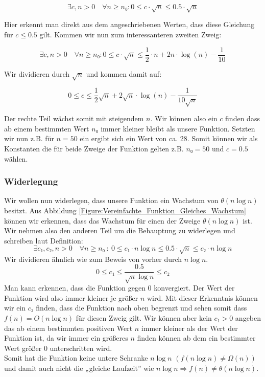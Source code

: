 \documentclass[a4paper, 12pt]{article}
\begin{document}
\[
	∃ c,n > 0 \quad ∀ n ≥ n₀ : 0 ≤ c⋅ \sqrt n ≤ 0.5 ⋅ \sqrt n
\]

Hier erkennt man direkt aus dem angeschriebenen Werten, dass diese Gleichung
für $c ≤ 0.5$ gilt. Kommen wir nun zum interessanteren zweiten Zweig:

\[
	∃ c,n > 0 \quad ∀ n≥ n₀:
	0 ≤ c⋅ \sqrt n ≤ \frac{1}{2}⋅ n + 2 n ⋅ \log\left(n\right) - \frac{1}{10}
\]

Wir dividieren durch $\sqrt n$ und kommen damit auf:

\[
	0 ≤ c ≤
	\frac{1}{2} \sqrt n + 2 \sqrt n ⋅ \log\left(n\right) - \frac{1}{10\sqrt n}
\]

Der rechte Teil wächst somit mit steigendem $n$. Wir können also ein $c$
finden dass ab einem bestimmten Wert $n₀$ immer kleiner bleibt als unsere
Funktion. Setzten wir nun z.B. für $n = 50$ ein ergibt sich ein Wert von ca.
28. Somit können wir als Konstanten die für beide Zweige der Funktion gelten
z.B. $n₀=50$ und $c=0.5$ wählen.

\subsubsection{Widerlegung}

Wir wollen nun widerlegen, dass unsere Funktion ein Wachstum von $θ \left(n
\log n\right)$ besitzt. Aus Abbildung
\ref{Figure:Vereinfachte_Funktion_Gleiches_Wachstum} können wir erkennen, dass
das Wachstum für einen der Zweige $θ \left(n \log n\right)$ ist. Wir nehmen
also den anderen Teil um die Behauptung zu widerlegen und schreiben laut
Definition:
\[
	∃ c₁,c₂, n > 0 \quad ∀ n ≥ n₀ ~ : ~
	0 ≤ c₁⋅ n \log n ≤ 0.5 ⋅ \sqrt n ≤ c₂ ⋅ n \log n
\]
Wir dividieren ähnlich wie zum Beweis von vorher durch $n \log n$.
\[
	0 ≤ c₁ ≤ \frac{0.5}{\sqrt{n}\log n} ≤ c₂
\]
Man kann erkennen, dass die Funktion gegen 0 konvergiert. Der Wert der
Funktion wird also immer kleiner je größer $n$ wird. Mit dieser Erkenntnis
können wir ein $c₂$ finden, dass die Funktion nach oben begrenzt und sehen
somit dass $f\left(n\right)=O\left(n\log n\right)$ für diesen Zweig gilt. Wir
können aber kein $c₁ > 0$ angeben das ab einem bestimmten positiven Wert $n$
immer kleiner als der Wert der Funktion ist, da wir immer ein größeres $n$
finden können ab dem ein bestimmter Wert größer 0 unterschritten wird.\\

Somit hat die Funktion keine untere Schranke $n \log n$ $\left(f(n \log n) ≠
Ω(n)\right)$ und damit auch nicht die „gleiche Laufzeit” wie $n \log n ⇒ f(n)
≠ θ(n \log n)$.
\end{document}
